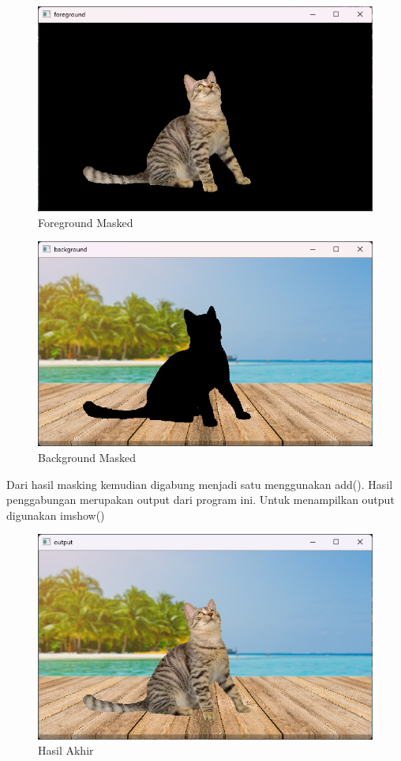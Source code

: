 \documentclass[]{article}
\begin{document}
\begin{figure}[H]
    \centering
    \includegraphics[width=12cm]{foregroundmasked.png}
    \caption{Foreground Masked}
\end{figure}
\begin{figure}[H]
    \centering
    \includegraphics[width=12cm]{backgroundmasked.png}
    \caption{Background Masked}
\end{figure}

Dari hasil masking kemudian digabung menjadi satu menggunakan add(). Hasil penggabungan merupakan output dari program ini. Untuk menampilkan output digunakan imshow()
\begin{figure}[H]
    \centering
    \includegraphics[width=12cm]{outputakhir.png}
    \caption{Hasil Akhir}
\end{figure}
\end{document}
